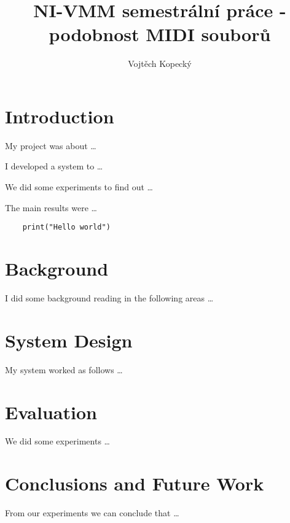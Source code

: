 \documentclass[12pt]{article}
\title{NI-VMM semestrální práce - podobnost MIDI souborů}
\author{Vojtěch Kopecký}
\begin{document}
\maketitle
\tableofcontents

\section{Introduction}

My project was about \ldots

I developed a system to \ldots

We did some experiments to find out \ldots

The main results were \ldots


\begin{verbatim}
    print("Hello world")
\end{verbatim}

\pagebreak

\section{Background}

I did some background reading in the following areas \ldots

\pagebreak

\section{System Design}

My system worked as follows \ldots

\pagebreak

\section{Evaluation}

We did some experiments \ldots

\pagebreak

\section{Conclusions and Future Work}

From our experiments we can conclude that \ldots


\end{document}
